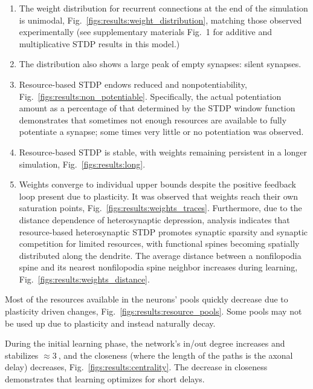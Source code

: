 \documentclass[utf8]{FrontiersinHarvard} %
\begin{document}
\begin{enumerate}
    \item The weight distribution for recurrent connections at the end of the simulation is unimodal, Fig.~\ref{figs:results:weight_distribution}, matching those observed experimentally (see supplementary materials Fig.~1 for additive and multiplicative STDP results in this model.)

    \item The distribution also shows a large peak of empty synapses: silent synapses.

    \item Resource-based STDP endows reduced and nonpotentiability, Fig.~\ref{figs:results:non_potentiable}. Specifically, the actual potentiation amount as a percentage of that determined by the STDP window function demonstrates that sometimes not enough resources are available to fully potentiate a synapse; some times very little or no potentiation was observed.

    \item Resource-based STDP is stable, with weights remaining persistent in a longer simulation, Fig.~\ref{figs:results:long}.

    \item Weights converge to individual upper bounds despite the positive feedback loop present due to plasticity. It was observed that weights reach their own saturation points, Fig.~\ref{figs:results:weights_traces}. Furthermore, due to the distance dependence of heterosynaptic depression, analysis indicates that resource-based heterosynaptic STDP promotes synaptic sparsity and synaptic competition for limited resources, with functional spines becoming spatially distributed along the dendrite. The average distance between a nonfilopodia spine and its nearest nonfilopodia spine neighbor increases during learning, Fig.~\ref{figs:results:weights_distance}.
\end{enumerate}

Most of the resources available in the neurons' pools quickly decrease due to plasticity driven changes, Fig.~\ref{figs:results:resource_pools}. Some pools may not be used up due to plasticity and instead naturally decay.

During the initial learning phase, the network's in/out degree increases and stabilizes $\approx\SI{3}{}$, and the closeness (where the length of the paths is the axonal delay) decreases, Fig.~\ref{figs:results:centrality}. The decrease in closeness demonstrates that learning optimizes for short delays. 
\end{document}
